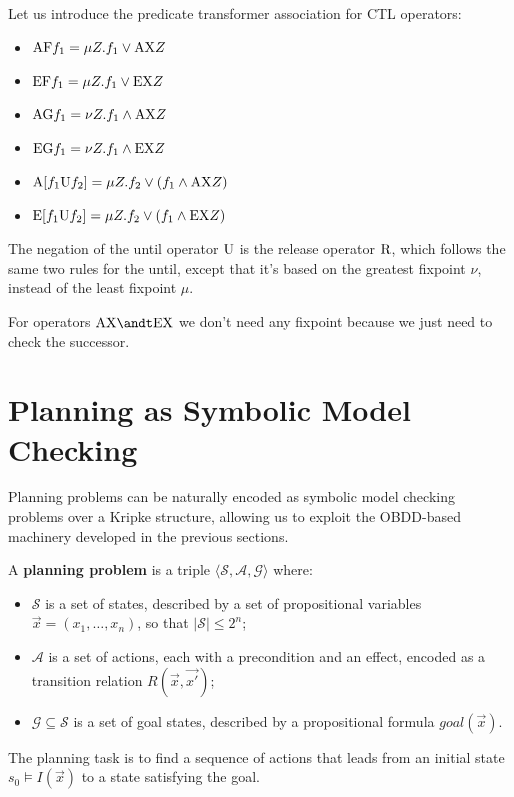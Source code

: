 \documentclass[oneside]{academica}
\begin{document}
Let us introduce the predicate transformer association for CTL operators:
\begin{itemize}
  \item $\mathrm{AF} f_1 = \mu Z. f_1 \lor \mathrm{AX} Z$
  \item $\mathrm{EF} f_1 = \mu Z. f_1 \lor \mathrm{EX} Z$
  \item $\mathrm{AG} f_1 = \nu Z. f_1 \land \mathrm{AX} Z$
  \item $\mathrm{EG} f_1 = \nu Z. f_1 \land \mathrm{EX} Z$
  \item $\mathrm{A}[f_1 \mathrm{U} f_2] = \mu Z. f_2 \lor (f_1 \land \mathrm{AX} Z)$
  \item $\mathrm{E}[f_1 \mathrm{U} f_2] = \mu Z. f_2 \lor (f_1 \land \mathrm{EX} Z)$
\end{itemize}
The negation of the until operator $\mathrm{U}$ is the release operator $\mathrm{R}$, which follows the same two rules for the until, except that it's based on the greatest fixpoint $\nu$, instead of the least fixpoint $\mu$.

For operators $\AX \andt \EX$ we don't need any fixpoint because we just need to check the successor.

%  

\section{Planning as Symbolic Model Checking}

Planning problems can be naturally encoded as symbolic model checking problems over a Kripke structure, allowing us to exploit the OBDD-based machinery developed in the previous sections.

A \textbf{planning problem} is a triple $\langle \mathcal{S}, \mathcal{A}, \mathcal{G} \rangle$ where:
\begin{itemize}
  \item $\mathcal{S}$ is a set of states, described by a set of propositional variables $\overrightarrow{x} = (x_1, \dots, x_n)$, so that $|\mathcal{S}| \le 2^n$;
  \item $\mathcal{A}$ is a set of actions, each with a precondition and an effect, encoded as a transition relation $R(\overrightarrow{x}, \overrightarrow{x'})$;
  \item $\mathcal{G} \subseteq \mathcal{S}$ is a set of goal states, described by a propositional formula $\mathit{goal}(\overrightarrow{x})$.
\end{itemize}
The planning task is to find a sequence of actions that leads from an initial state $s_0 \models I(\overrightarrow{x})$ to a state satisfying the goal.
\end{document}
